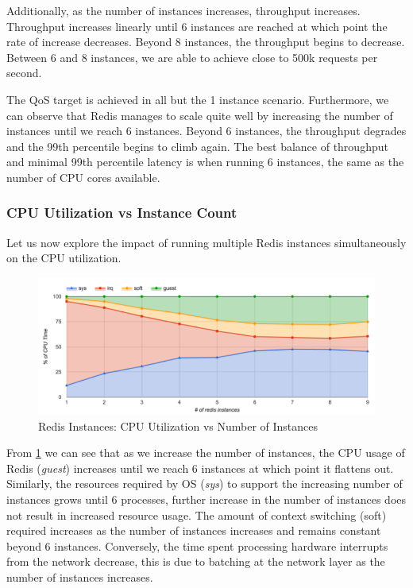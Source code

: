 Additionally, as the number of instances increases, throughput increases. Throughput increases linearly until 6 instances are reached at which point the rate of increase decreases. Beyond 8 instances, the throughput begins to decrease. Between 6 and 8 instances, we are able to achieve close to 500k requests per second.

The QoS target is achieved in all but the 1 instance scenario. Furthermore, we can observe that Redis manages to scale quite well by increasing the number of instances until we reach 6 instances. Beyond 6 instances, the throughput degrades and the 99th percentile begins to climb again. The best balance of throughput and minimal 99th percentile latency is when running 6 instances, the same as the number of CPU cores available.

\subsubsection{CPU Utilization vs Instance Count}
Let us now explore the impact of running multiple Redis instances simultaneously on the CPU utilization.

\begin{figure}[h]
    \includegraphics[width=\textwidth]{./res/6_instances_cpu.png}
    \caption{Redis Instances: CPU Utilization vs Number of Instances}
    \label{fig:6_instances_cpu.png}
\end{figure}

From \ref{fig:6_instances_cpu.png} we can see that as we increase the number of instances, the CPU usage of Redis (\textit{guest}) increases until we reach 6 instances at which point it flattens out. Similarly, the resources required by OS (\textit{sys}) to support the increasing number of instances grows until 6 processes, further increase in the number of instances does not result in increased resource usage. The amount of context switching (soft) required increases as the number of instances increases and remains constant beyond 6 instances. Conversely, the time spent processing hardware interrupts from the network decrease, this is due to batching at the network layer as the number of instances increases.

